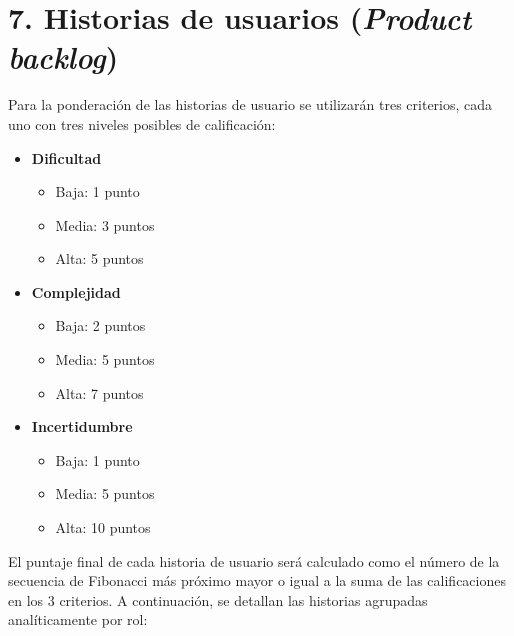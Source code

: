 \documentclass[
11pt, %
]{charter}
\begin{document}
\section{7. Historias de usuarios (\textit{Product backlog})}
\label{sec:backlog}

Para la ponderación de las historias de usuario se utilizarán tres criterios, cada uno con tres niveles posibles de calificación:

\begin{itemize}

    \item \textbf{Dificultad}
    \begin{itemize}
        \item Baja: 1 punto
        \item Media: 3 puntos
        \item Alta: 5 puntos
    \end{itemize}

    \item \textbf{Complejidad}
    \begin{itemize}
        \item Baja: 2 puntos
        \item Media: 5 puntos
        \item Alta: 7 puntos
    \end{itemize}

    \item \textbf{Incertidumbre}
    \begin{itemize}
        \item Baja: 1 punto
        \item Media: 5 puntos
        \item Alta: 10 puntos
    \end{itemize}

\end{itemize}

El puntaje final de cada historia de usuario será calculado como el número de la secuencia de Fibonacci más próximo mayor o igual a la suma de las calificaciones en los 3 criterios. A continuación, se detallan las historias agrupadas analíticamente por rol:
\end{document}
